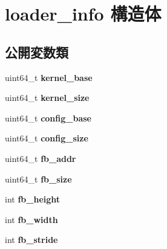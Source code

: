 \hypertarget{structloader__info}{}\section{loader\+\_\+info 構造体}
\label{structloader__info}
\subsection*{公開変数類}
\begin{DoxyCompactItemize}
\item 
\hypertarget{structloader__info_aa148e3c904ba43281cdd45e01d793347}{}uint64\+\_\+t {\bfseries kernel\+\_\+base}\label{structloader__info_aa148e3c904ba43281cdd45e01d793347}

\item 
\hypertarget{structloader__info_ab2674c143481654517776580d8223781}{}uint64\+\_\+t {\bfseries kernel\+\_\+size}\label{structloader__info_ab2674c143481654517776580d8223781}

\item 
\hypertarget{structloader__info_a415726bcdc3a139a80bbaa4fc6326764}{}uint64\+\_\+t {\bfseries config\+\_\+base}\label{structloader__info_a415726bcdc3a139a80bbaa4fc6326764}

\item 
\hypertarget{structloader__info_ac5e2a4ab750df4b2b2e17080faac4a01}{}uint64\+\_\+t {\bfseries config\+\_\+size}\label{structloader__info_ac5e2a4ab750df4b2b2e17080faac4a01}

\item 
\hypertarget{structloader__info_a112e32ed8b29e2e0b3a05f83808c900b}{}uint64\+\_\+t {\bfseries fb\+\_\+addr}\label{structloader__info_a112e32ed8b29e2e0b3a05f83808c900b}

\item 
\hypertarget{structloader__info_ad96aaa3361d34e57ee71e55f99f6aafa}{}uint64\+\_\+t {\bfseries fb\+\_\+size}\label{structloader__info_ad96aaa3361d34e57ee71e55f99f6aafa}

\item 
\hypertarget{structloader__info_af1a4f5d69d31b73059a3f8f7c941cd9d}{}int {\bfseries fb\+\_\+height}\label{structloader__info_af1a4f5d69d31b73059a3f8f7c941cd9d}

\item 
\hypertarget{structloader__info_ae1e36e8e327d9e32107b8cb1979e2052}{}int {\bfseries fb\+\_\+width}\label{structloader__info_ae1e36e8e327d9e32107b8cb1979e2052}

\item 
\hypertarget{structloader__info_ac5f9ac4ea2a4eedcd4d80ebeb533e626}{}int {\bfseries fb\+\_\+stride}\label{structloader__info_ac5f9ac4ea2a4eedcd4d80ebeb533e626}


\end{DoxyCompactItemize}
